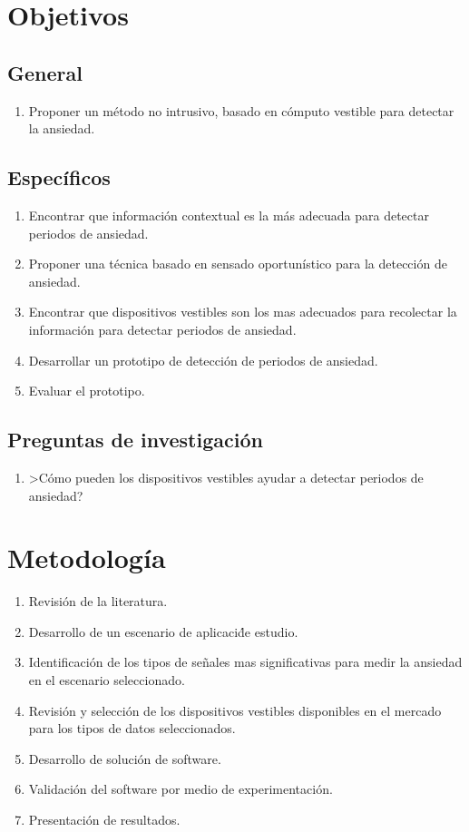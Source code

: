 \documentclass[letterpaper,12pt]{cicese}
\begin{document}
		\chapter{Objetivos}
			\section{General}
				\begin{enumerate}
					\item Proponer un m\'etodo no intrusivo, basado en c\'omputo vestible para detectar la ansiedad.
				\end{enumerate}
			\section{Espec\'ificos}
				\begin{enumerate}
					\item Encontrar que informaci\'on contextual es la m\'as adecuada para detectar periodos de ansiedad.
					\item Proponer una t\'ecnica basado en sensado oportun\'istico para la detecci\'on de ansiedad.
					\item Encontrar que dispositivos vestibles son los mas adecuados para recolectar la informaci\'on para detectar periodos de ansiedad.
					\item Desarrollar un prototipo de detecci\'on de periodos de ansiedad.
					\item Evaluar el prototipo.
				\end{enumerate}
			\section{Preguntas de investigaci\'on}
				\begin{enumerate}
					\item >C\'omo pueden los dispositivos vestibles ayudar a detectar periodos de ansiedad?
				\end{enumerate}
		\chapter{Metodolog\'ia}
				\begin{enumerate}
					\item Revisi\'on de la literatura.
					\item Desarrollo de un escenario de aplicaci\'de estudio.
					\item Identificaci\'on de los tipos de se\~nales mas significativas para medir la ansiedad en el escenario seleccionado.
					\item Revisi\'on y selecci\'on de los dispositivos vestibles disponibles en el mercado para los tipos de datos seleccionados.
					\item Desarrollo de soluci\'on de software.
					\item Validaci\'on del software por medio de experimentaci\'on.
					\item Presentaci\'on de resultados.
				\end{enumerate}
\end{document}
